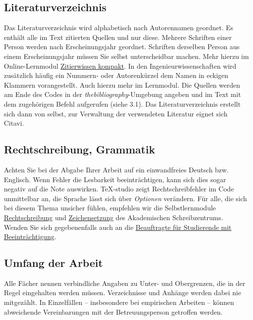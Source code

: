 \documentclass[a4paper,11pt]{article}%
\renewcommand{\\}{\vspace*{0.5\baselineskip} \newline}
\begin{document}
\subsection{Literaturverzeichnis}
Das Literaturverzeichnis wird alphabetisch nach Autorennamen geordnet. Es enthält alle im Text zitierten Quellen und nur diese. Mehrere Schriften einer Person werden nach Erscheinungsjahr geordnet. Schriften derselben Person aus einem Erscheinungsjahr müssen Sie selbst unterscheidbar machen. Mehr hierzu im Online-Lernmodul \href{https://ilias.th-koeln.de/ilias.php?baseClass=ilRepositoryGUI}{\underline{Zitierwissen kompakt}}.\\
In den Ingenieurwissenschaften wird zusätzlich häufig ein Nummern- oder Autorenkürzel dem Namen in eckigen Klammern vorangestellt. Auch hierzu mehr im Lernmodul.\\
Die Quellen werden am Ende des Codes in der \textit{thebibliography}-Umgebung angeben und im Text mit dem zugehörigen Befehl aufgerufen (siehe 3.1). Das Literaturverzeichnis erstellt sich dann von selbst, zur Verwaltung der verwendeten Literatur eignet sich Citavi.

\subsection{Rechtschreibung, Grammatik}
Achten Sie bei der Abgabe Ihrer Arbeit auf ein einwandfreies Deutsch bzw. Englisch. Wenn Fehler die Lesbarkeit beeinträchtigen, kann sich dies sogar negativ auf die Note auswirken. \TeX -studio zeigt Rechtschreibfehler im Code unmittelbar an, die Sprache lässt sich über \textit{Optionen} verändern.\\
Für alle, die sich bei diesem Thema unsicher fühlen, empfehlen wir die Selbstlernmodule \href{https://ilias.th-koeln.de/ilias.php?baseClass=ilRepositoryGUI}{\underline{Rechtschreibung}} und \href{https://ilias.th-koeln.de/ilias.php?baseClass=ilRepositoryGUI}{\underline{Zeichensetzung}} des Akademischen Schreibzentrums. Wenden Sie sich gegebenenfalls auch an die \href{https://www.th-koeln.de/personen/nadine.sohn/}{\underline{Beauftragte für Studierende mit Beeinträchtigung}}.

\subsection{Umfang der Arbeit}
Alle Fächer nennen verbindliche Angaben zu Unter- und Obergrenzen, die in der Regel eingehalten werden müssen. Verzeichnisse und Anhänge werden dabei nie mitgezählt. In Einzelfällen – insbesondere bei empirischen Arbeiten – können abweichende Vereinbarungen mit der Betreuungsperson getroffen werden.
\end{document}
